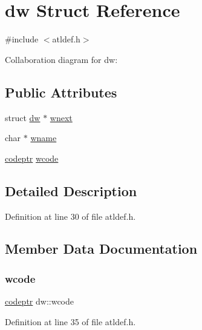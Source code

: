 \hypertarget{structdw}{}\section{dw Struct Reference}
\label{structdw}


{\ttfamily \#include $<$atldef.\+h$>$}



Collaboration diagram for dw\+:
\subsection*{Public Attributes}
\begin{DoxyCompactItemize}
\item 
struct \hyperlink{structdw}{dw} $\ast$ \hyperlink{structdw_a6fd18eca22adae516d1ef8a9cda62731}{wnext}
\item 
char $\ast$ \hyperlink{structdw_ad9c6a6d8a3ede7131f23b63f893400a9}{wname}
\item 
\hyperlink{atldef_8h_ad466be4642ab9d5805335482af705120}{codeptr} \hyperlink{structdw_a7a0c4f17de4e8afd95a04e61ad08f424}{wcode}
\end{DoxyCompactItemize}


\subsection{Detailed Description}


Definition at line 30 of file atldef.\+h.



\subsection{Member Data Documentation}
\mbox{\label{structdw_a7a0c4f17de4e8afd95a04e61ad08f424}} 
\subsubsection{\texorpdfstring{wcode}{wcode}}
{\footnotesize\ttfamily \hyperlink{atldef_8h_ad466be4642ab9d5805335482af705120}{codeptr} dw\+::wcode}



Definition at line 35 of file atldef.\+h.

\mbox{\label{structdw_ad9c6a6d8a3ede7131f23b63f893400a9}} 
